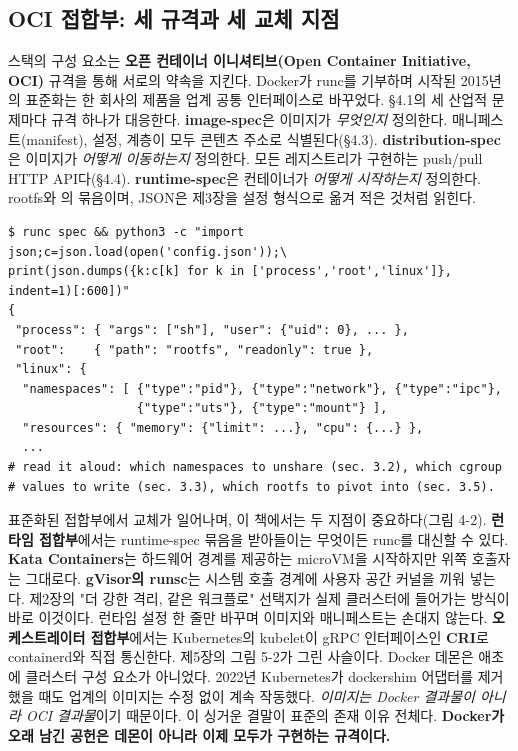 \subsection*{OCI 접합부: 세 규격과 세 교체 지점}

스택의 구성 요소는 \textbf{오픈 컨테이너 이니셔티브(Open Container Initiative, OCI)} 규격을 통해 서로의 약속을 지킨다. Docker가 runc를 기부하며 시작된 2015년의 표준화는 한 회사의 제품을 업계 공통 인터페이스로 바꾸었다. §4.1의 세 산업적 문제마다 규격 하나가 대응한다. \textbf{image-spec}은 이미지가 \textit{무엇인지} 정의한다. 매니페스트(manifest), 설정, 계층이 모두 콘텐츠 주소로 식별된다(§4.3). \textbf{distribution-spec}은 이미지가 \textit{어떻게 이동하는지} 정의한다. 모든 레지스트리가 구현하는 push/pull HTTP API다(§4.4). \textbf{runtime-spec}은 컨테이너가 \textit{어떻게 시작하는지} 정의한다. rootfs와 의 묶음이며, JSON은 제3장을 설정 형식으로 옮겨 적은 것처럼 읽힌다.

\begin{terminalbox}
\begin{Verbatim}[breaklines=true,breakanywhere=true,fontsize=\small,formatcom=\color{tbbtermfg},codes=\tbbcodeactive]
$ runc spec && python3 -c "import json;c=json.load(open('config.json'));\
print(json.dumps({k:c[k] for k in ['process','root','linux']}, indent=1)[:600])"
{
 "process": { "args": ["sh"], "user": {"uid": 0}, ... },
 "root":    { "path": "rootfs", "readonly": true },
 "linux": {
  "namespaces": [ {"type":"pid"}, {"type":"network"}, {"type":"ipc"},
                  {"type":"uts"}, {"type":"mount"} ],
  "resources": { "memory": {"limit": ...}, "cpu": {...} },
  ...
# read it aloud: which namespaces to unshare (sec. 3.2), which cgroup
# values to write (sec. 3.3), which rootfs to pivot into (sec. 3.5).
\end{Verbatim}
\end{terminalbox}

표준화된 접합부에서 교체가 일어나며, 이 책에서는 두 지점이 중요하다(그림 4-2). \textbf{런타임 접합부}에서는 runtime-spec 묶음을 받아들이는 무엇이든 runc를 대신할 수 있다. \textbf{Kata Containers}는 하드웨어 경계를 제공하는 microVM을 시작하지만 위쪽 호출자는 그대로다. \textbf{gVisor의 runsc}는 시스템 호출 경계에 사용자 공간 커널을 끼워 넣는다. 제2장의 "더 강한 격리, 같은 워크플로" 선택지가 실제 클러스터에 들어가는 방식이 바로 이것이다. 런타임 설정 한 줄만 바꾸며 이미지와 매니페스트는 손대지 않는다. \textbf{오케스트레이터 접합부}에서는 Kubernetes의 kubelet이 gRPC 인터페이스인 \textbf{CRI}로 containerd와 직접 통신한다. 제5장의 그림 5-2가 그린 사슬이다. Docker 데몬은 애초에 클러스터 구성 요소가 아니었다. 2022년 Kubernetes가 dockershim 어댑터를 제거했을 때도 업계의 이미지는 수정 없이 계속 작동했다. \textit{이미지는 Docker 결과물이 아니라 OCI 결과물}이기 때문이다. 이 싱거운 결말이 표준의 존재 이유 전체다. \textbf{Docker가 오래 남긴 공헌은 데몬이 아니라 이제 모두가 구현하는 규격이다.}

